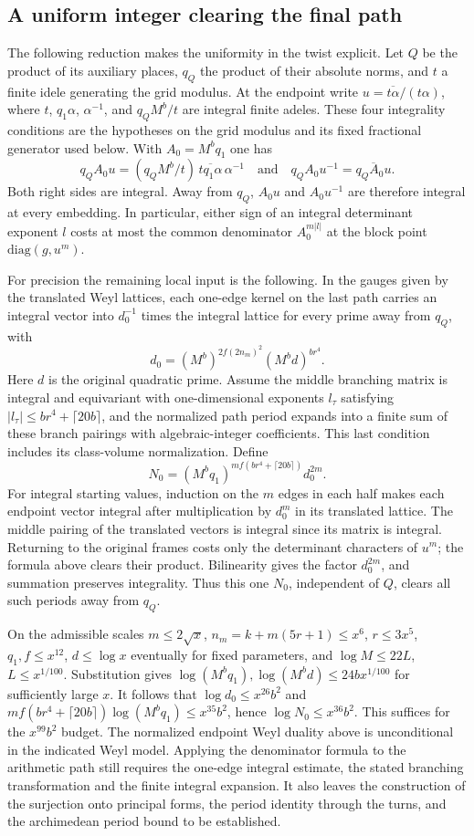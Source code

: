 \subsection{A uniform integer clearing the final path}
\label{pathmath:denom}
The following reduction makes the uniformity in the twist explicit. Let $Q$ be the product of its auxiliary places, $q_Q$ the product of their absolute norms, and $t$ a finite idele generating the grid modulus. At the endpoint write $u=\overline{t\alpha}/(t\alpha)$, where $t$, $q_1\alpha$, $\alpha^{-1}$, and $q_Q M^b/t$ are integral finite adeles. These four integrality conditions are the hypotheses on the grid modulus and its fixed fractional generator used below. With $A_0=M^b q_1$ one has
\[
 q_QA_0u=(q_Q M^b/t)\,\overline{tq_1\alpha}\,\alpha^{-1}
 \quad\text{and}\quad q_Q A_0u^{-1}=\overline{q_QA_0u}.
\]
Both right sides are integral. Away from $q_Q$, $A_0u$ and $A_0u^{-1}$ are therefore integral at every embedding. In particular, either sign of an integral determinant exponent $l$ costs at most the common denominator $A_0^{m|l|}$ at the block point $\mathrm{diag}(g,u^m)$.

For precision the remaining local input is the following. In the gauges given by the translated Weyl lattices, each one-edge kernel on the last path carries an integral vector into $d_0^{-1}$ times the integral lattice for every prime away from $q_Q$, with
\[
 d_0=(M^b)^{2f(2n_m)^2}(M^b d)^{br^4}.
\]
Here $d$ is the original quadratic prime. Assume the middle branching matrix is integral and equivariant with one-dimensional exponents $l_\tau$ satisfying $|l_\tau|\le br^4+\lceil20b\rceil$, and the normalized path period expands into a finite sum of these branch pairings with algebraic-integer coefficients. This last condition includes its class-volume normalization. Define
\[
 N_0=(M^bq_1)^{mf(br^4+\lceil20b\rceil)}d_0^{2m}.
\]
For integral starting values, induction on the $m$ edges in each half makes each endpoint vector integral after multiplication by $d_0^m$ in its translated lattice. The middle pairing of the translated vectors is integral since its matrix is integral. Returning to the original frames costs only the determinant characters of $u^m$; the formula above clears their product. Bilinearity gives the factor $d_0^{2m}$, and summation preserves integrality. Thus this one $N_0$, independent of $Q$, clears all such periods away from $q_Q$.

On the admissible scales $m\le2\sqrt{x}$, $n_m=k+m(5r+1)\le x^6$, $r\le3x^5$, $q_1,f\le x^{12}$, $d\le\log x$ eventually for fixed parameters, and $\log M\le22L$, $L\le x^{1/100}$. Substitution gives $\log(M^bq_1),\log(M^bd)\le 24b x^{1/100}$ for sufficiently large $x$. It follows that $\log d_0\le x^{26}b^2$ and $mf(br^4+\lceil20b\rceil)\log(M^bq_1)\le x^{35}b^2$, hence $\log N_0\le x^{36}b^2$. This suffices for the $x^{99}b^2$ budget. The normalized endpoint Weyl duality above is unconditional in the indicated Weyl model. Applying the denominator formula to the arithmetic path still requires the one-edge integral estimate, the stated branching transformation and the finite integral expansion. It also leaves the construction of the surjection onto principal forms, the period identity through the turns, and the archimedean period bound to be established.

